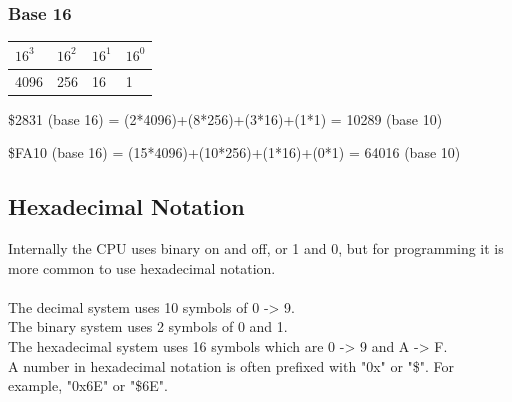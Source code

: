 \documentclass{ol-softwaremanual}
\begin{document}
\subsubsection{Base 16}
\begin{table}[h]
\begin{tabular}{llll}
$16^3$ & $16^2$ & $16^1$ & $16^0$ \\ \hline
4096 & 256 & 16 & 1                     \\
\end{tabular}
\end{table}
\$2831 (base 16) = (2*4096)+(8*256)+(3*16)+(1*1) = 10289 (base 10)

\$FA10 (base 16) = (15*4096)+(10*256)+(1*16)+(0*1) = 64016 (base 10)
\pagebreak

\subsection{Hexadecimal Notation}
Internally the CPU uses binary on and off, or 1 and 0, but for programming it is more common to use hexadecimal notation.\\
\\
The decimal system uses 10 symbols of 0 -> 9.\\
The binary system uses 2 symbols of 0 and 1.\\
The hexadecimal system uses 16 symbols which are 0 -> 9  and A -> F.\\

A number in hexadecimal notation is often prefixed with "0x" or "\$". For example, "0x6E" or "\$6E".\\
\end{document}
